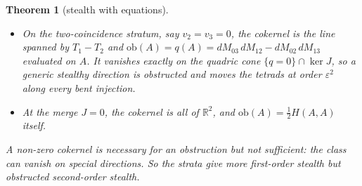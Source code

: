 \documentclass[11pt]{article}
\newtheorem{theorem}{Theorem}\renewcommand{\thetheorem}{\Alph{theorem}}
\theoremstyle{definition}\newtheorem{definition}{Definition}\newtheorem{remark}{Remark}
\newcommand{\R}{\mathbb R}
\begin{document}
\begin{theorem}[stealth with equations]
\begin{enumerate}
\begin{itemize}
  injection, letting $Q$ depend on $\varepsilon$, keeps the tetrads still to third order.
\item On the two-coincidence stratum, say $v_2=v_3=0$, the cokernel is the line spanned by $T_1-T_2$ and
  $\mathrm{ob}(A)=q(A)=dM_{03}\,dM_{12}-dM_{02}\,dM_{13}$ evaluated on $A$. It vanishes exactly on the quadric cone $\{q=0\}\cap\ker J$, so
  a generic stealthy direction is obstructed and moves the tetrads at order $\varepsilon^2$ along every bent injection.
\item At the merge $J=0$, the cokernel is all of $\R^2$, and $\mathrm{ob}(A)=\tfrac12H(A,A)$ itself.
\end{itemize}
A non-zero cokernel is necessary for an obstruction but not sufficient: the class can vanish on special directions. So the strata give
more first-order stealth but obstructed second-order stealth.
\end{enumerate}
\end{theorem}
\end{document}
